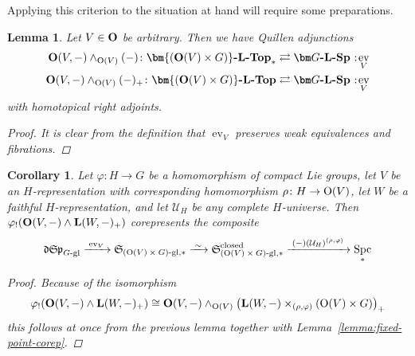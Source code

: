 \documentclass[reqno]{memo-l}
\theoremstyle{mythm}
\newtheorem{lemma}[thm]{Lemma}
\newtheorem{cor}[thm]{Corollary}
\theoremstyle{definition}
\numberwithin{equation}{section}
\newcommand{\Uu}{{\mathcal{U}}}
\DeclareMathOperator{\ev}{ev}
\renewcommand{\phi}{\varphi}
\DeclareMathOperator{\Spc}{Spc}
\newcommand{\cat}[1]{\textbf{\textup{#1}}}
\renewcommand{\O}{{\textup{O}}}
\let\smashp=\wedge
\newcommand{\iso}{\xrightarrow{\;\smash{\raisebox{-0.25ex}{\ensuremath{\scriptstyle\sim}}}\;}}
\newcommand\noloc{%
	\nobreak
	\mspace{6mu plus 1mu}
	{:}
	\nonscript\mkern-\thinmuskip
	\mathpunct{}
	\mspace{2mu}
}
\newcommand{\mySp}{{\mathfrak S\kern-.5pt\mathfrak p}}
\newcommand{\myLSp}{{\mathfrak d\kern-.25pt}\mySp}
\newcommand{\myS}{{{\mathfrak S\kern-.4pt}}}
\begin{document}
Applying this criterion to the situation at hand will require some preparations.

\begin{lemma}\label{lemma:ev-RA}
    Let $V\in\cat{O}$ be arbitrary. Then we have Quillen adjunctions
    \begin{align*}
        \cat{O}(V,-)\smashp_{\O(V)}{(-)}\colon\cat{$\bm{(\O(V)\times G)}$-$\cat{L}$-Top}_*&\rightleftarrows\cat{$\bm G$-$\cat{L}$-Sp}\noloc\ev_V\\
        \cat{O}(V,-)\smashp_{\O(V)}{(-)_+}\colon\cat{$\bm{(\O(V)\times G)}$-$\cat{L}$-Top}&\rightleftarrows\cat{$\bm G$-$\cat{L}$-Sp}\noloc\ev_V
    \end{align*}
    with homotopical right adjoints.
    \begin{proof}
        It is clear from the definition that $\ev_V$ preserves weak equivalences and fibrations.
    \end{proof}
\end{lemma}

\begin{cor}\label{cor:ev_V-corep}
    Let $\phi\colon H\to G$ be a homomorphism of compact Lie groups, let $V$ be an $H$-representation with corresponding homomorphism $\rho\colon H\to\O(V)$, let $W$ be a faithful $H$-representation, and let $\Uu_H$ be any complete $H$-universe. Then $\phi_!(\cat{O}(V,-)\smashp\cat{L}(W,-)_+)$ corepresents the composite
    \begin{equation}\label{eq:semifree-corep}
        \myLSp_\textup{$G$-gl}\xrightarrow{\;\ev_V\;}\myS_{\textup{$(\O(V)\times G)$-gl},*}\iso\myS_{\textup{$(\O(V)\times G)$-gl},*}^\textup{closed}\xrightarrow{\;(-)(\Uu_H)^{(\rho,\phi)}\;}\Spc_*
    \end{equation}
    \begin{proof}
        Because of the isomorphism \[\phi_!(\cat{O}(V,-)\smashp\cat{L}(W,-)_+)\cong\cat{O}(V,-)\smashp_{\O(V)}\big(\cat{L}(W,-)\times_{(\rho,\phi)}(\O(V)\times G)\big)_+\] this follows at once from the previous lemma together with Lemma~\ref{lemma:fixed-point-corep}.
    \end{proof}
\end{cor}
\end{document}
